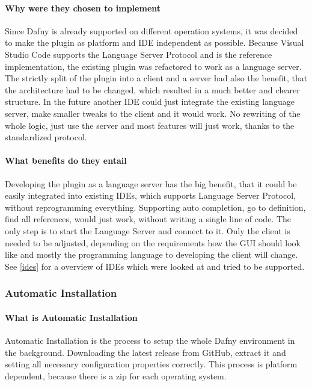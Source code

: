 \paragraph{Why were they chosen to implement}
Since Dafny is already supported on different operation systems, it was decided to make the plugin as platform and IDE independent as possible. Because Visual Studio Code supports the Language Server Protocol and is the reference implementation, the existing plugin was refactored to work as a language server. The strictly split of the plugin into a client and a server had also the benefit, that the architecture had to be changed, which resulted in a much better and clearer structure. \newline
In the future another IDE could just integrate the existing language server, make smaller tweaks to the client and it would work. No rewriting of the whole logic, just use the server and most features will just work, thanks to the standardized protocol. 
\paragraph{What benefits do they entail}
Developing the plugin as a language server has the big benefit, that it could be easily integrated into existing IDEs, which supports Language Server Protocol, without reprogramming everything. Supporting auto completion, go to definition, find all references, would just work, without writing a single line of code. The only step is to start the Language Server and connect to it. Only the client is needed to be adjusted, depending on the requirements how the GUI should look like and mostly the programming language to developing the client will change. 
See \ref{ides} for a overview of IDEs which were looked at and tried to be supported. 
\subsubsection{Automatic Installation} \label{setupAutomaticInstallation}
\paragraph{What is Automatic Installation}
Automatic Installation is the process to setup the whole Dafny environment in the background. Downloading the latest release from GitHub, extract it and setting all necessary configuration properties correctly. This process is platform dependent, because there is a zip for each operating system. 
